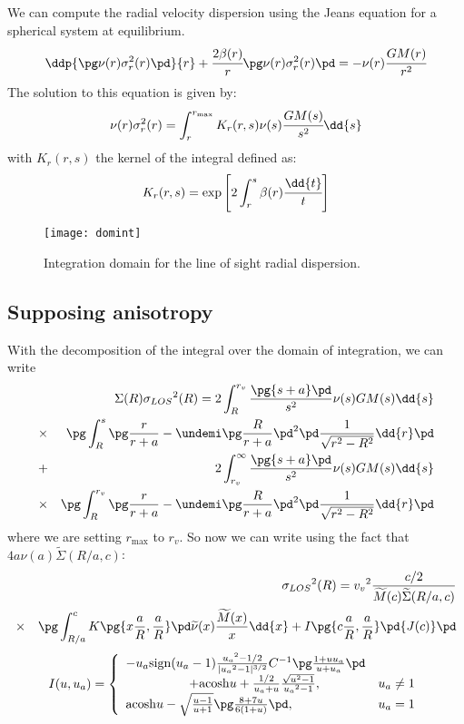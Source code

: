 We can compute the radial velocity dispersion using the Jeans equation
for a spherical system at equilibrium.
\[
\ddp{\pg\nu(r)\sigma_r^2(r)\pd}{r} + \cfrac{2\mybeta}{r}\pg\nu(r)\sigma_r^2(r)\pd=
-\nu(r)\cfrac{GM(r)}{r^2}
\]
The solution to this equation is given by:
\[
\myprofil\sigma_r^2(r)=\int_r^{r_{\mathrm{max}}}K_r(r,s)\nu(s)\cfrac{GM(s)}{s^2}\dd{s}
\]
with $K_r(r,s)$ the kernel of the integral defined as:
\[
K_r(r,s)=\exp\left[2\int_r^s\mybeta\cfrac{\dd{t}}{t}\right]
\]
\begin{figure}[H]
    \centering
    \texttt{[image: domint]}
    \caption{\footnotesize{}Integration domain for the line of sight radial dispersion.}
    \label{fig:domint}
\end{figure}

\subsection{Supposing \citet{ML05} anisotropy}
With the decomposition of the integral over the domain of integration, we can write
\begin{eqnarray}
    &&\Sigma{(R)}{\sigma_{LOS}}^2{(R)}=2\int_R^{r_v}{\frac{\pg{s+a}\pd}{s^2}{\nu(s)}{G}{M(s)}}{\dd{s}}\nonumber\\
    &\times&\pg\int_R^s{\pg\frac{r}{r+a}-\undemi\pg\frac{R}{r+a}\pd^2\pd\frac{1}{\sqrt{r^2-R^2}}\dd{r}}\pd\nonumber\\
    &+&2\int_{r_v}^{\infty}{\frac{\pg{s+a}\pd}{s^2}{\nu(s)}{G}{M(s)}}{\dd{s}}\nonumber\\
    &\times&\pg\int_R^{r_v}{\pg\frac{r}{r+a}-\undemi\pg\frac{R}{r+a}\pd^2\pd\frac{1}{\sqrt{r^2-R^2}}\dd{r}}\pd\nonumber\\
\end{eqnarray}
where we are setting $r_{\mathrm{max}}$ to $r_v$.
So now we can write using the fact that $4a\nu(a)\widetilde{\Sigma}(R/a,c)$:
\begin{eqnarray}
    &&{\sigma_{LOS}}^2{(R)}={v_v}^2\frac{c/2}{\widetilde{M}{(c)}\widetilde{\Sigma}{(R/a,c)}}\nonumber\\
    &\times&\pg\int_{R/a}^c{{K}\pg{x\frac{a}{R},\frac{a}{R}}\pd}\widetilde{\nu}{(x)}
    \frac{\widetilde{M}{(x)}}{x}\dd{x}+I\pg{c\frac{a}{R},\frac{a}{R}}\pd{J(c)}\pd\nonumber\\
\end{eqnarray}
\begin{equation}
    I(u,u_a)=\left\{\begin{array}{lr}
        -u_a{\rm{sign}}(u_a-1)\frac{{u_a}^2-1/2}{|{u_a}^2-1|^{3/2}}{C^{-1}\pg\frac{1+u{u_a}}{u+u_a}\pd}&\\
        \hspace{5em}+{\rm{acosh}}{u}+\frac{1/2}{u_a+u}\frac{\sqrt{u^2-1}}{{u_a}^2-1},&{u_a}\neq1\\
        {\rm{acosh}}{u}-\sqrt{\frac{u-1}{u+1}}\pg\frac{8+7u}{6(1+u)}\pd,&{u_a}=1\\
    \end{array}\right.
\end{equation}
